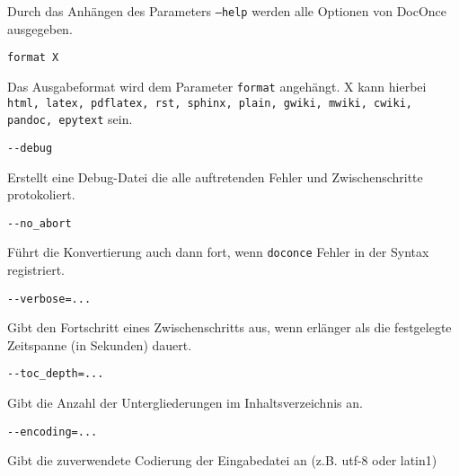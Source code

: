 \documentclass[%
oneside,                 %
final,                   %
chapterprefix=true,      %
open=right,              %
10pt]{book}
\begin{document}
Durch das Anhängen des Parameters \texttt{--help} werden alle Optionen von DocOnce ausgegeben.

\begin{verbatim}
format X
\end{verbatim}

Das Ausgabeformat wird dem Parameter \texttt{format} angehängt. X kann hierbei \texttt{html, latex, pdflatex, rst, sphinx, plain, gwiki, mwiki, cwiki, pandoc, epytext} sein.

\begin{verbatim}
--debug
\end{verbatim}

Erstellt eine Debug-Datei die alle auftretenden Fehler und Zwischenschritte protokoliert.

\begin{verbatim}
--no_abort
\end{verbatim}

Führt die Konvertierung auch dann fort, wenn \texttt{doconce} Fehler in der Syntax registriert.

\begin{verbatim}
--verbose=...
\end{verbatim}

Gibt den Fortschritt eines Zwischenschritts aus, wenn erlänger als die festgelegte Zeitspanne (in Sekunden) dauert.

\begin{verbatim}
--toc_depth=...
\end{verbatim}

Gibt die Anzahl der Untergliederungen im Inhaltsverzeichnis an.

\begin{verbatim}
--encoding=...
\end{verbatim}

Gibt die zuverwendete Codierung der Eingabedatei an (z.B. utf-8 oder latin1)
\end{document}
